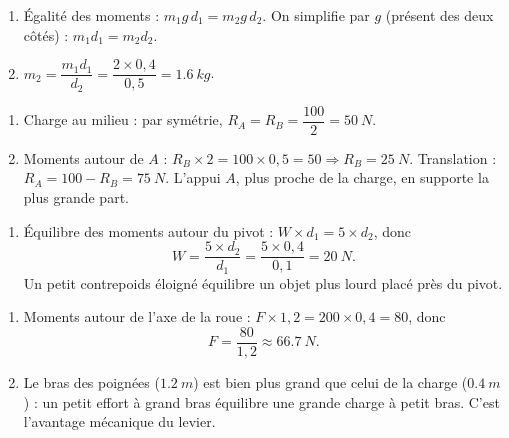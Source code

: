 \documentclass[11pt,a4paper]{article}
\begin{document}
\begin{corrige}
\begin{enumerate}[label=\alph*)]
  \item Égalité des moments : $m_1 g\, d_1 = m_2 g\, d_2$. On simplifie par $g$ (présent des deux
        côtés) : $m_1 d_1 = m_2 d_2$.
  \item $m_2 = \dfrac{m_1 d_1}{d_2} = \dfrac{2\times 0{,}4}{0{,}5} = \qty{1.6}{kg}$.
\end{enumerate}
\end{corrige}

\begin{corrige}
\begin{enumerate}[label=\alph*)]
  \item Charge au milieu : par symétrie, $R_A = R_B = \dfrac{100}{2} = \qty{50}{N}$.
  \item Moments autour de $A$ : $R_B\times 2 = 100\times 0{,}5 = 50 \Rightarrow R_B = \qty{25}{N}$.
        Translation : $R_A = 100 - R_B = \qty{75}{N}$. L'appui $A$, plus proche de la charge, en
        supporte la plus grande part.
\end{enumerate}
\end{corrige}

\begin{corrige}
\begin{enumerate}[label=\alph*)]
  \item Équilibre des moments autour du pivot : $W\times d_1 = 5\times d_2$, donc
        \[ W = \frac{5\times d_2}{d_1} = \frac{5\times 0{,}4}{0{,}1} = \qty{20}{N}. \]
        Un petit contrepoids éloigné équilibre un objet plus lourd placé près du pivot.
\end{enumerate}
\end{corrige}

\begin{corrige}[la brouette]
\begin{enumerate}[label=\alph*)]
  \item Moments autour de l'axe de la roue : $F\times 1{,}2 = 200\times 0{,}4 = 80$, donc
        \[ F = \frac{80}{1{,}2} \approx \qty{66.7}{N}. \]
  \item Le bras des poignées ($\qty{1.2}{m}$) est bien plus grand que celui de la charge
        ($\qty{0.4}{m}$) : un petit effort à grand bras équilibre une grande charge à petit bras.
        C'est l'avantage mécanique du levier.
\end{enumerate}
\end{corrige}
\end{document}

